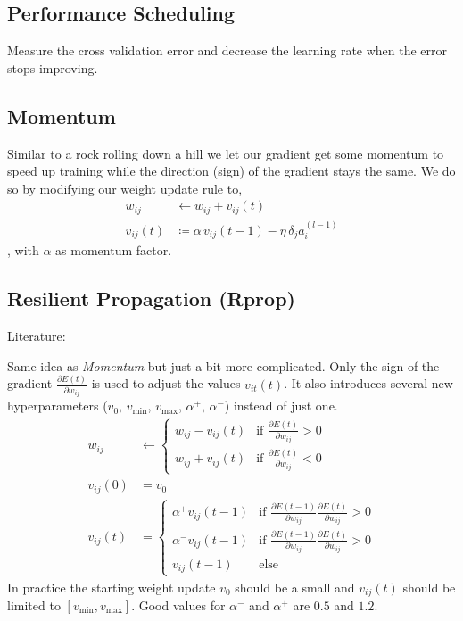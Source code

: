 \subsection{Performance Scheduling}
Measure the cross validation error and decrease the learning rate when the error stops improving.

\subsection{Momentum}\label{sec:momentum}
Similar to a rock rolling down a hill we let our gradient get some momentum to speed up training while the direction (sign) of the gradient stays the same. We do so by modifying our weight update rule to,
\begin{align}\label{eq:momentum}
w_{ij} &\leftarrow w_{ij} + v_{ij}(t)\\
v_{ij}(t) &\coloneqq \alpha\, v_{ij}(t-1) - \eta\, \delta_j a_i^{(l-1)}
\end{align}
, with $\alpha$ as momentum factor.

\subsection{Resilient Propagation (Rprop)}\label{sec:rprop}
Literature: \cite{Riedmiller1994}

Same idea as \emph{Momentum} but just a bit more complicated. Only the sign of the gradient $\frac{\partial E(t)}{\partial w_{ij}}$ is used to adjust the values $v_{it}(t)$. It also introduces several new hyperparameters ($v_0$, $v_{\text{min}}$, $v_{\text{max}}$, $\alpha^+$, $\alpha^-$) instead of just one.
\begin{align}
w_{ij} &\leftarrow \begin{cases}
	w_{ij} - v_{ij}(t) & \text{if } \frac{\partial E(t)}{\partial w_{ij}} > 0\\
	w_{ij} + v_{ij}(t) & \text{if } \frac{\partial E(t)}{\partial w_{ij}} < 0
	\end{cases}\\
v_{ij}(0) &= v_0\\
v_{ij}(t) &= \begin{cases}
	\alpha^+ v_{ij}(t-1) & \text{if } \frac{\partial E(t-1)}{\partial w_{ij}} \frac{\partial E(t)}{\partial w_{ij}} > 0\\
	\alpha^- v_{ij}(t-1) & \text{if } \frac{\partial E(t-1)}{\partial w_{ij}} \frac{\partial E(t)}{\partial w_{ij}} > 0\\
	v_{ij}(t-1) & \text{else}
	\end{cases}
\end{align}
In practice the starting weight update $v_0$ should be a small and $v_{ij}(t)$ should be limited to $[v_{\text{min}}, v_{\text{max}}]$. Good values for $\alpha^-$ and $\alpha^+$ are $0.5$ and $1.2$.


